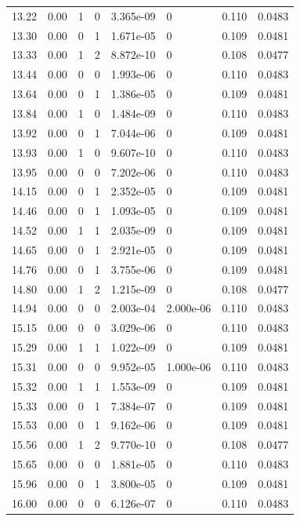 \documentclass[preview]{standalone}
\begin{document}
{{{\begin{tabular}{L{1.2cm}C{1.2cm} C{0.3cm}C{0.5cm} C{1.4cm}C{1.4cm} C{1.4cm}C{1.4cm}}
  13.22  &  0.00  & 1     &  0 &  3.365e-09  & 0  & 0.110 &  0.0483   \\ 
  13.30  &  0.00  & 0     &  1 &  1.671e-05  & 0  & 0.109 &  0.0481   \\ 
  13.33  &  0.00  & 1     &  2 &  8.872e-10  & 0  & 0.108 &  0.0477   \\ 
  13.44  &  0.00  & 0     &  0 &  1.993e-06  & 0  & 0.110 &  0.0483   \\ 
  13.64  &  0.00  & 0     &  1 &  1.386e-05  & 0  & 0.109 &  0.0481   \\ 
  13.84  &  0.00  & 1     &  0 &  1.484e-09  & 0  & 0.110 &  0.0483   \\ 
  13.92  &  0.00  & 0     &  1 &  7.044e-06  & 0  & 0.109 &  0.0481   \\ 
  13.93  &  0.00  & 1     &  0 &  9.607e-10  & 0  & 0.110 &  0.0483   \\ 
  13.95  &  0.00  & 0     &  0 &  7.202e-06  & 0  & 0.110 &  0.0483   \\ 
  14.15  &  0.00  & 0     &  1 &  2.352e-05  & 0  & 0.109 &  0.0481   \\ 
  14.46  &  0.00  & 0     &  1 &  1.093e-05  & 0  & 0.109 &  0.0481   \\ 
  14.52  &  0.00  & 1     &  1 &  2.035e-09  & 0  & 0.109 &  0.0481   \\ 
  14.65  &  0.00  & 0     &  1 &  2.921e-05  & 0  & 0.109 &  0.0481   \\ 
  14.76  &  0.00  & 0     &  1 &  3.755e-06  & 0  & 0.109 &  0.0481   \\ 
  14.80  &  0.00  & 1     &  2 &  1.215e-09  & 0  & 0.108 &  0.0477   \\ 
  14.94  &  0.00  & 0     &  0 &  2.003e-04  & 2.000e-06  & 0.110 &  0.0483   \\ 
  15.15  &  0.00  & 0     &  0 &  3.029e-06  & 0  & 0.110 &  0.0483   \\ 
  15.29  &  0.00  & 1     &  1 &  1.022e-09  & 0  & 0.109 &  0.0481   \\ 
  15.31  &  0.00  & 0     &  0 &  9.952e-05  & 1.000e-06  & 0.110 &  0.0483   \\ 
  15.32  &  0.00  & 1     &  1 &  1.553e-09  & 0  & 0.109 &  0.0481   \\ 
  15.33  &  0.00  & 0     &  1 &  7.384e-07  & 0  & 0.109 &  0.0481   \\ 
  15.53  &  0.00  & 0     &  1 &  9.162e-06  & 0  & 0.109 &  0.0481   \\ 
  15.56  &  0.00  & 1     &  2 &  9.770e-10  & 0  & 0.108 &  0.0477   \\ 
  15.65  &  0.00  & 0     &  0 &  1.881e-05  & 0  & 0.110 &  0.0483   \\ 
  15.96  &  0.00  & 0     &  1 &  3.800e-05  & 0  & 0.109 &  0.0481   \\ 
  16.00  &  0.00  & 0     &  0 &  6.126e-07  & 0  & 0.110 &  0.0483   \\ 
\hline 
\end{tabular} 

}}}
\end{document}
